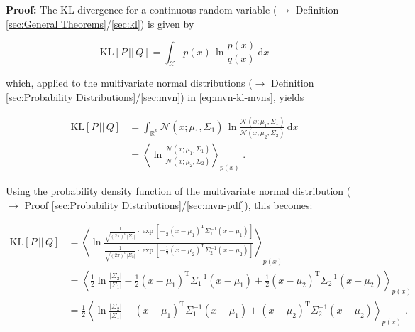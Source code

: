 \documentclass[a4paper,12pt,twoside]{book}
\begin{document}
\vspace{1em}
\textbf{Proof:} The KL divergence for a continuous random variable ($\rightarrow$ Definition \ref{sec:General Theorems}/\ref{sec:kl}) is given by 

\begin{equation} \label{eq:mvn-kl-KL-cont}
\mathrm{KL}[P\,||\,Q] = \int_{\mathcal{X}} p(x) \, \ln \frac{p(x)}{q(x)} \, \mathrm{d}x
\end{equation}

which, applied to the multivariate normal distributions ($\rightarrow$ Definition \ref{sec:Probability Distributions}/\ref{sec:mvn}) in \eqref{eq:mvn-kl-mvns}, yields

\begin{equation} \label{eq:mvn-kl-mvn-KL-s1}
\begin{split}
\mathrm{KL}[P\,||\,Q] &= \int_{\mathbb{R}^n} \mathcal{N}(x; \mu_1, \Sigma_1) \, \ln \frac{\mathcal{N}(x; \mu_1, \Sigma_1)}{\mathcal{N}(x; \mu_2, \Sigma_2)} \, \mathrm{d}x \\
&= \left\langle \ln \frac{\mathcal{N}(x; \mu_1, \Sigma_1)}{\mathcal{N}(x; \mu_2, \Sigma_2)} \right\rangle_{p(x)} \; .
\end{split}
\end{equation}

Using the probability density function of the multivariate normal distribution ($\rightarrow$ Proof \ref{sec:Probability Distributions}/\ref{sec:mvn-pdf}), this becomes:

\begin{equation} \label{eq:mvn-kl-mvn-KL-s2}
\begin{split}
\mathrm{KL}[P\,||\,Q] &= \left\langle \ln \frac{ \frac{1}{\sqrt{(2 \pi)^n |\Sigma_1|}} \cdot \exp \left[ -\frac{1}{2} (x-\mu_1)^\mathrm{T} \Sigma_1^{-1} (x-\mu_1) \right] }{ \frac{1}{\sqrt{(2 \pi)^n |\Sigma_2|}} \cdot \exp \left[ -\frac{1}{2} (x-\mu_2)^\mathrm{T} \Sigma_2^{-1} (x-\mu_2) \right] } \right\rangle_{p(x)} \\
&= \left\langle \frac{1}{2} \ln \frac{|\Sigma_2|}{|\Sigma_1|} - \frac{1}{2} (x-\mu_1)^\mathrm{T} \Sigma_1^{-1} (x-\mu_1) + \frac{1}{2} (x-\mu_2)^\mathrm{T} \Sigma_2^{-1} (x-\mu_2) \right\rangle_{p(x)} \\
&= \frac{1}{2} \left\langle \ln \frac{|\Sigma_2|}{|\Sigma_1|} - (x-\mu_1)^\mathrm{T} \Sigma_1^{-1} (x-\mu_1) + (x-\mu_2)^\mathrm{T} \Sigma_2^{-1} (x-\mu_2) \right\rangle_{p(x)} \; .
\end{split}
\end{equation}
\end{document}
